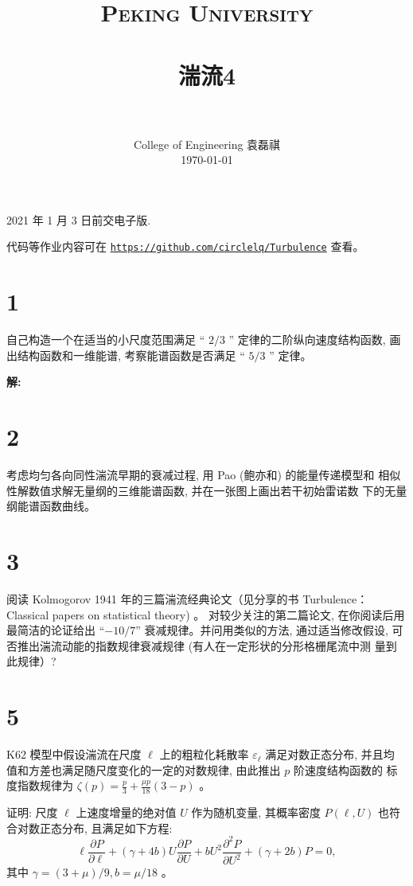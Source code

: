 \documentclass[12pt,a4]{ctexart}
\title{
   \vspace{-1in}
   \usefont{OT1}{bch}{b}{n}
   \normalfont \normalsize \textsc{\LARGE Peking University}\\[1cm] %
   \horrule{0.5pt} \\[0.5cm]
   \huge \bfseries{湍流4} \\
   \horrule{2pt} \\[0.5cm]
}
\author{
   \normalfont									\normalsize
   College of Engineering \quad 2001111690  \quad 袁磊祺\\	\normalsize
   \today
}
\date{}
\begin{document}


\maketitle

2021 年 1 月 3 日前交电子版.

代码等作业内容可在 \texttt{\href{https://github.com/circlelq/Turbulence}{https://github.com/circlelq/Turbulence}} 查看。


\section{1}

自己构造一个在适当的小尺度范围满足 “ $2 / 3$ ” 定律的二阶纵向速度结构函数, 画出结构函数和一维能谱, 考察能谱函数是否满足 “ $5 / 3$ ” 定律。

\textsf{\hspace{-2em}\sf  \textbf{解:}}


\section{2}

考虑均匀各向同性湍流早期的衰减过程, 用 Pao (鲍亦和) 的能量传递模型和 相似性解数值求解无量纲的三维能谱函数, 并在一张图上画出若干初始雷诺数 下的无量纲能谱函数曲线。


\section{3}

阅读 Kolmogorov 1941 年的三篇湍流经典论文（见分享的书 Turbulence： Classical papers on statistical theory) 。 对较少关注的第二篇论文, 在你阅读后用 最简洁的论证给出 “$-10/7$” 衰减规律。并问用类似的方法, 通过适当修改假设, 可否推出湍流动能的指数规律衰减规律 (有人在一定形状的分形格栅尾流中测 量到此规律）?

\section{5}

K62 模型中假设湍流在尺度 $\ell$ 上的粗粒化耗散率 $\varepsilon_{\ell}$ 满足对数正态分布, 并且均
值和方差也满足随尺度变化的一定的对数规律, 由此推出 $p$ 阶速度结构函数的
标度指数规律为 $\zeta(p)=\frac{p}{3}+\frac{\mu p}{18}(3-p)$ 。

证明: 尺度 $\ell$ 上速度增量的绝对值 $U$ 作为随机变量, 其概率密度 $P(\ell, U)$ 也符合对数正态分布, 且满足如下方程:
\begin{equation}
   \ell \frac{\partial P}{\partial \ell}+(\gamma+4 b) U \frac{\partial P}{\partial U}+b U^{2} \frac{\partial^{2} P}{\partial U^{2}}+(\gamma+2 b) P=0,
\end{equation}
其中 $\gamma=(3+\mu) / 9, b=\mu / 18$ 。
\end{document}
